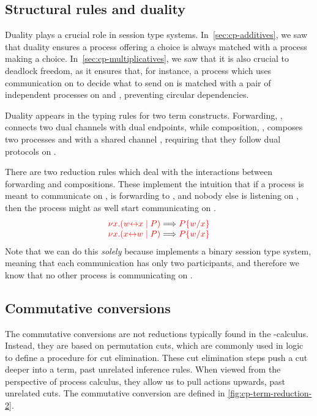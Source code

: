 \subsection{Structural rules and duality}
\label{sec:cp-duality}
Duality plays a crucial role in session type systems.
In~\cref{sec:cp-additives}, we saw that duality ensures a process offering a choice
is always matched with a process making a choice.
In~\cref{sec:cp-multiplicatives}, we saw that it is also crucial to deadlock freedom,
as it ensures that, for instance, a process which uses communication on 
to decide what to send on  is matched with a pair of independent processes
on  and , preventing circular dependencies.


Duality appears in the typing rules for two \rcp term constructs.
Forwarding, , connects two dual channels with dual endpoints,
while composition, , composes two processes  and
 with a shared channel , requiring that they follow dual protocols
on .
\begin{center}
  \cpInfAx
  \cpInfCut
\end{center}
There are two reduction rules which deal with the interactions between
forwarding and compositions. These implement the intuition that if a process is
meant to communicate on ,  is forwarding to , and nobody else
is listening on , then the process might as well start communicating on
.
\[
  \begin{array}{c}
    \tm{\cpCut{x}{\cpLink{w}{x}}{P}} \Longrightarrow \tm{\cpSub{w}{x}{P}} 
    \\
    \tm{\cpCut{x}{\cpLink{x}{w}}{P}} \Longrightarrow \tm{\cpSub{w}{x}{P}}  
  \end{array}
\]
Note that we can do this \emph{solely} because \rcp implements a binary session
type system, meaning that each communication has only two participants, and
therefore we know that no other process is communicating on .

\subsection{Commutative conversions}
\label{sec:cp-commutative-conversions}
The commutative conversions are not reductions typically found in the
\textpi-calculus.
Instead, they are based on permutation cuts, which are commonly used in logic to
define a procedure for cut elimination.
These cut elimination steps push a cut deeper into a term, past unrelated
inference rules.
When viewed from the perspective of process calculus, they allow us to pull
actions upwards, past unrelated cuts.
The commutative conversion are defined in \cref{fig:cp-term-reduction-2}.

